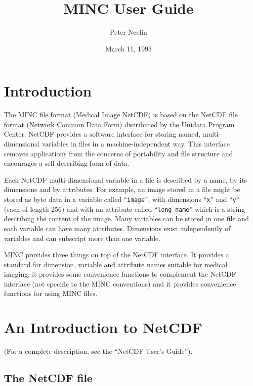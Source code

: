 \title{MINC User Guide}
\author{Peter Neelin}
\date{March 11, 1993}
\textwidth 6.0in
\oddsidemargin 0.125in
\textheight 8.5in
\topmargin -0.75in



\maketitle

\section{Introduction}

The MINC file format (Medical Image NetCDF) is based on the NetCDF
file format (Network Common Data Form) distributed by the Unidata
Program Center. NetCDF provides a software interface for storing
named, multi-dimensional variables in files in a machine-independent
way. This interface removes applications from the concerns of
portability and file structure and encourages a self-describing form
of data.

Each NetCDF multi-dimensional variable in a file is described by a
name, by its dimensions and by attributes. For example, an image
stored in a file might be stored as byte data in a variable called
``\verb+image+'', with dimensions ``\verb+x+'' and ``\verb+y+'' (each
of length 256) and with an attribute called ``\verb+long_name+'' which
is a string describing the content of the image. Many variables can be
stored in one file and each variable can have many attributes.
Dimensions exist independently of variables and can subscript more
than one variable.

MINC provides three things on top of the NetCDF interface. It provides
a standard for dimension, variable and attribute names suitable for
medical imaging, it provides some convenience functions to complement
the NetCDF interface (not specific to the MINC conventions) and it
provides convenience functions for using MINC files.

\section{An Introduction to NetCDF}

(For a complete description, see the ``NetCDF User's Guide'').

\subsection{The NetCDF file}


